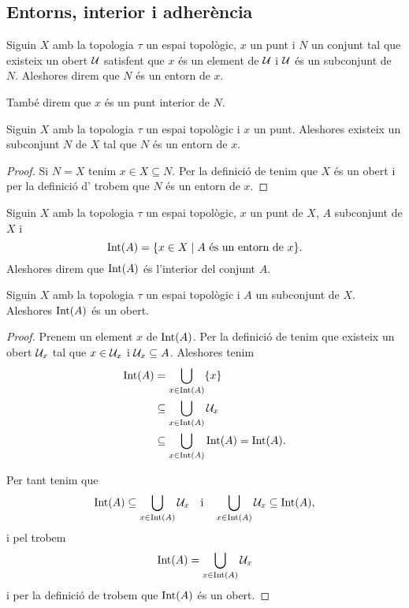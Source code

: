 \documentclass[../Apunts.tex]{subfiles}
\begin{document}
	\subsection{Entorns, interior i adherència}
	\begin{definition}[Entorn]
		\label{def:entorn}
		\label{def:punt interior}
		Siguin \(X\) amb la topologia \(\tau\) un espai topològic, \(x\) un punt i \(N\) un conjunt tal que existeix un obert \(\mathcal{U}\) satisfent que \(x\) és un element de \(\mathcal{U}\) i \(\mathcal{U}\) és un subconjunt de \(N\). Aleshores direm que \(N\) és un entorn de \(x\).
		
		També direm que \(x\) és un punt interior de \(N\).
	\end{definition}
	\begin{observation}
		\label{obs:tot punt té un entorn}
		Siguin \(X\) amb la topologia \(\tau\) un espai topològic i \(x\) un punt. Aleshores existeix un subconjunt \(N\) de \(X\) tal que \(N\) és un entorn de \(x\).
		\begin{proof}
			Si \(N=X\) tenim \(x\in X\subseteq N\). Per la definició de  tenim que \(X\) és un obert i per la definició d' trobem que \(N\) és un entorn de \(x\).
		\end{proof}
	\end{observation}
	\begin{definition}[Interior]
		\label{def:interior}
		Siguin \(X\) amb la topologia \(\tau\) un espai topològic, \(x\) un punt de \(X\), \(A\) subconjunt de \(X\) i
		\[\operatorname{Int}(A)=\{x\in X\mid A\text{ és un entorn de }x\}.\]
		Aleshores direm que \(\operatorname{Int}(A)\) és l'interior del conjunt \(A\).
	\end{definition}
	\begin{proposition}
		\label{prop:l'interior d'un conjunt és un obert}
		Siguin \(X\) amb la topologia \(\tau\) un espai topològic i \(A\) un subconjunt de \(X\). Aleshores \(\operatorname{Int}(A)\) és un obert.
		\begin{proof}
			Prenem un element \(x\) de \(\operatorname{Int}(A)\). Per la definició de  tenim que existeix un obert \(\mathcal{U}_{x}\) tal que \(x\in\mathcal{U}_{x}\) i \(\mathcal{U}_{x}\subseteq A\). Aleshores tenim
			\begin{align*}
				\operatorname{Int}(A)&=\bigcup_{x\in\operatorname{Int}(A)}\{x\} \\
				&\subseteq\bigcup_{x\in\operatorname{Int}(A)}\mathcal{U}_{x} \\
				&\subseteq\bigcup_{x\in\operatorname{Int}(A)}\operatorname{Int}(A)=\operatorname{Int}(A).
			\end{align*}
			
			Per tant tenim que
			\[\operatorname{Int}(A)\subseteq\bigcup_{x\in\operatorname{Int}(A)}\mathcal{U}_{x}\quad\text{i}\quad\bigcup_{x\in\operatorname{Int}(A)}\mathcal{U}_{x}\subseteq\operatorname{Int}(A),\]
			i pel  trobem
			\[\operatorname{Int}(A)=\bigcup_{x\in\operatorname{Int}(A)}\mathcal{U}_{x}\]
			i per la definició de  trobem que \(\operatorname{Int}(A)\) és un obert.
		\end{proof}
	\end{proposition}
\end{document}
